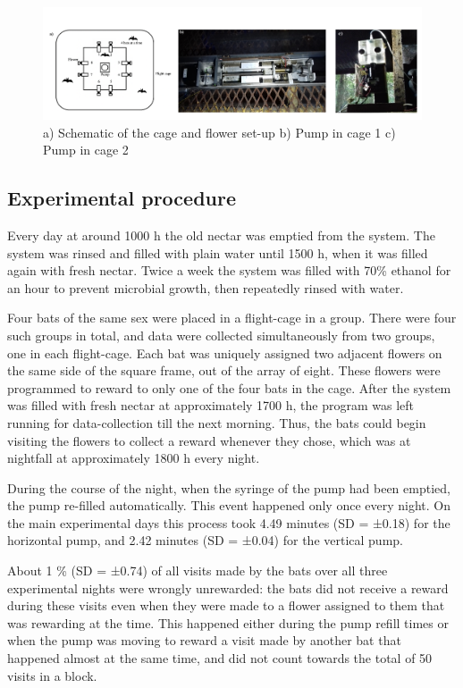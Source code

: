 \documentclass[
]{article}
\begin{document}
\begin{figure}[H]

{\centering \includegraphics[width=28.19in]{images/allthree} 

}

\caption{a) Schematic of the cage and flower set-up b) Pump in cage 1 c) Pump in cage 2}\label{fig:Pump-pictures}
\end{figure}

\hypertarget{experimental-procedure}{%
\subsection{Experimental procedure}\label{experimental-procedure}}

Every day at around 1000 h the old nectar was emptied from the system. The system was rinsed and filled with plain water until 1500 h, when it was filled again with fresh nectar. Twice a week the system was filled with 70\% ethanol for an hour to prevent microbial growth, then repeatedly rinsed with water.

Four bats of the same sex were placed in a flight-cage in a group. There were four such groups in total, and data were collected simultaneously from two groups, one in each flight-cage. Each bat was uniquely assigned two adjacent flowers on the same side of the square frame, out of the array of eight. These flowers were programmed to reward to only one of the four bats in the cage. After the system was filled with fresh nectar at approximately 1700 h, the program was left running for data-collection till the next morning. Thus, the bats could begin visiting the flowers to collect a reward whenever they chose, which was at nightfall at approximately 1800 h every night.

During the course of the night, when the syringe of the pump had been emptied, the pump re-filled automatically. This event happened only once every night. On the main experimental days this process took 4.49 minutes (SD = ±0.18) for the horizontal pump, and 2.42 minutes (SD = ±0.04) for the vertical pump.

About 1 \% (SD = ±0.74) of all visits made by the bats over all three experimental nights were wrongly unrewarded: the bats did not receive a reward during these visits even when they were made to a flower assigned to them that was rewarding at the time. This happened either during the pump refill times or when the pump was moving to reward a visit made by another bat that happened almost at the same time, and did not count towards the total of 50 visits in a block.
\end{document}
